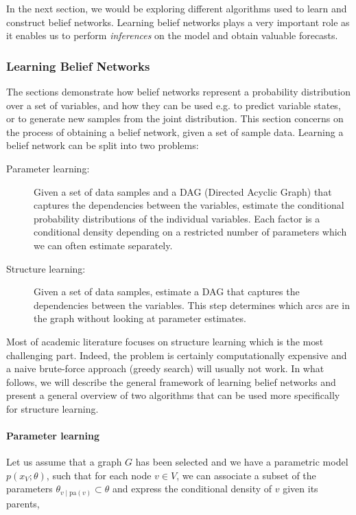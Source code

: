 In the next section, we would be exploring different algorithms used to learn and construct belief networks. Learning belief networks plays a very important role as it enables us to perform \textit{inferences} on the model and obtain valuable forecasts.

\subsubsection{Learning Belief Networks}
\label{learn}

The sections demonstrate how belief networks represent a probability distribution over a set of variables, and how they can be used e.g. to predict variable states, or to generate new samples from the joint distribution. This section concerns on the process of obtaining a belief network, given a set of sample data. Learning a belief network can be split into two problems:\\

\begin{description}
	\item[Parameter learning:]{Given a set of data samples and a DAG (Directed Acyclic Graph) that captures the dependencies between the variables, estimate the conditional probability distributions of the individual variables. Each factor is a conditional density depending on a restricted number of parameters which we can often estimate separately.}
	\item[Structure learning:]{Given a set of data samples, estimate a DAG that captures the dependencies between the variables. This step determines which arcs are in the graph without looking at parameter estimates.}
\end{description}

Most of academic literature focuses on structure learning which is the most challenging part. Indeed, the problem is certainly computationally expensive and a naive brute-force approach (greedy search) will usually not work. In what follows, we will describe the general framework of learning belief networks and present a general overview of two algorithms that can be used more specifically for structure learning.

\paragraph{Parameter learning}

Let us assume that a graph $G$ has been selected and we have a parametric model $p(x_V;\theta)$, such that for each node $v \in V$, we can associate a subset of the parameters $\theta_{v\mid\text{pa}(v)}\subset \theta$ and express the conditional density of $v$ given its parents,

